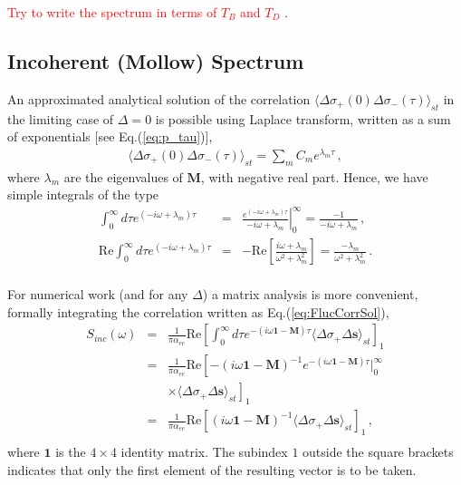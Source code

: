 \documentclass[twocolumn,aps,eqsecnum,showkeys,amsmath]{revtex4-2}
\begin{document}
\textcolor{red}{Try to write the spectrum in terms of $T_B$ and $T_D$} 
\cite{HePl95}.

\subsection{Incoherent (Mollow) Spectrum} 
An approximated analytical solution of the correlation 
$\langle \Delta \sigma_+(0) \Delta \sigma_-(\tau) \rangle_{st}$ in the 
limiting case of $\Delta =0$ is possible using Laplace transform, written 
as a sum of exponentials [see Eq.(\ref{eq:p_tau})],
%
\begin{eqnarray}
\langle \Delta \sigma_+(0) \Delta \sigma_-(\tau) \rangle_{st} 
	= \sum_m C_m e^{\lambda_m \tau} \,, 
\end{eqnarray}
where $\lambda_m$ are the eigenvalues of $\mathbf{M}$, with negative 
real part. Hence, we have simple integrals of the type
%
\begin{eqnarray} 	%
\int_0^{\infty} d\tau e^{(-i \omega +\lambda_m) \tau} 
	&=& \left. \frac{e^{(-i \omega +\lambda_m) \tau}}
	{-i \omega +\lambda_m} \right|_0^{\infty} 
	= \frac{-1}{-i \omega +\lambda_m} \,,	\nonumber 	\\ 
\mathrm{Re} \int_0^{\infty} d\tau e^{(-i \omega +\lambda_m) \tau} 
	&=& - \mathrm{Re} \left[ \frac{i \omega +\lambda_m}
	{ \omega^2 +\lambda_m^2} \right] 
	= \frac{- \lambda_m}{ \omega^2 +\lambda_m^2} \,. \nonumber \\
\end{eqnarray}

For numerical work (and for any $\Delta$) a matrix analysis is more 
convenient, formally integrating the correlation written as
Eq.(\ref{eq:FlucCorrSol}), 
%
\begin{eqnarray} 	%
S_{inc}(\omega) 
&=& \frac{1}{ \pi \alpha_{ee}  } \mathrm{Re} \left[  \int_0^{\infty} 
	d\tau e^{-(i \omega \mathbf{1} -\mathbf{M}) \tau} 	
	\langle \Delta \sigma_+ \Delta \mathbf{s} \rangle_{st} \right]_1   
	\nonumber \\ 
&=& \frac{1}{ \pi \alpha_{ee}  } \mathrm{Re} \left[ 
	-(i \omega \mathbf{1} -\mathbf{M})^{-1} 
	e^{-(i \omega \mathbf{1} -\mathbf{M}) \tau} \left. \right|_0^{\infty}  
	 \right. 	\nonumber \\
&&	\left. \times 
	\langle \Delta \sigma_+ \Delta \mathbf{s} \rangle_{st} \right]_1 	
	\nonumber \\ 
&=& \frac{1}{ \pi \alpha_{ee}  } \mathrm{Re} \left[ 
	(i \omega \mathbf{1} -\mathbf{M})^{-1} 
	\langle \Delta \sigma_+ \Delta \mathbf{s} \rangle_{st} \right]_1 	\,, 	
	\nonumber \\ 
\end{eqnarray}
where $\mathbf{1}$ is the $4 \times 4$ identity matrix. The subindex $1$ 
outside the square brackets indicates that only the first element of the 
resulting vector is to be taken.
\end{document}
